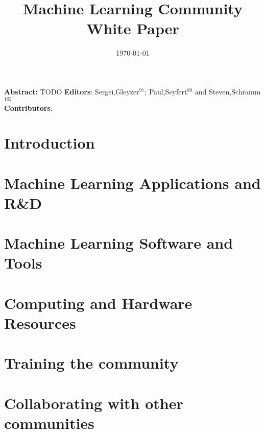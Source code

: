 \documentclass{article}
\title{Machine Learning Community White Paper}
\date{\today}
\begin{document}
\normalsize



\clearpage


\maketitle

\setlength\parindent{0pt}
{\bf Abstract:} TODO
\vskip 1cm
{\bf Editors}: Sergei,Gleyzer$^{97}$; Paul,Seyfert$^{89}$ and Steven,Schramm$^{102}$\\
\newline
{\bf Contributors}:


\tableofcontents
\clearpage

\section{Introduction}
\label{sec:introduction}


\section{Machine Learning Applications and R\&D}
\label{sec:applications}


\section{Machine Learning Software and Tools}
\label{sec:software}


%

\section{Computing and Hardware Resources}
\label{sec:resources}


\section{Training the community}
\label{sec:training}


\section{Collaborating with other communities}
\label{sec:collaboration}

\end{document}
